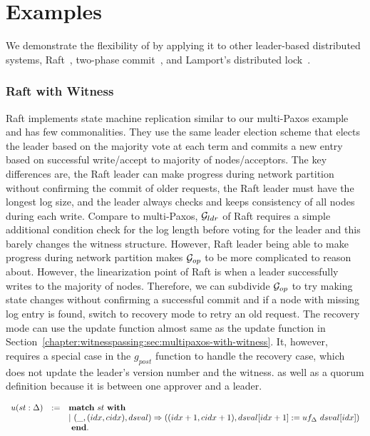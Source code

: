 \section{Examples}
\label{chapter:witnesspassing:sec:examples}

We demonstrate the flexibility of \sysname{} by applying it to other leader-based distributed systems, Raft~\cite{raft}, two-phase commit~\cite{distsys}, and Lamport's distributed
lock~\cite{lamportclock}.

\subsubsection{Raft with Witness}
Raft implements state machine replication similar to our multi-Paxos example and
has few commonalities. They use the same leader election scheme that elects
the leader based on the majority vote at each term and commits a new entry based on
successful write/accept to majority of nodes/acceptors. The key differences are, 
the Raft leader can make progress during network partition without confirming the 
commit of older requests, the Raft leader must have the longest log size, and 
the leader always checks and keeps consistency of all nodes during each write.
Compare to multi-Paxos, $\mathcal{G}_{ldr}$ of Raft requires a simple additional
condition check for the log length before voting for the leader and this barely
changes the witness structure. However, Raft leader being able to make progress
during network partition makes $\mathcal{G}_{op}$ to be more complicated to
reason about. However, the linearization point of Raft is when a leader
successfully writes to the majority of nodes. Therefore, we can subdivide
$\mathcal{G}_{op}$ to try making state changes without confirming a successful
commit and if a node with missing log entry is found, switch to recovery mode
to retry an old request. The recovery mode can use the update function almost same 
as the update function in Section~\ref{chapter:witnesspassing:sec:multipaxos-with-witness}. It, however, 
requires a special case in the $g_{post}$ function to handle the recovery case, 
which does not update the leader's version number and the witness.  
as well as a quorum definition because it is between one approver and a leader.
\begin{center}
$
\begin{array}{lll}
u (st : \dsvalue) &:=&  \mbox{\textbf{match}} \ st \ \mbox{\textbf{with}}\\
&& \vert~(\_, (idx, cidx), dsval) \Rightarrow ((idx + 1, cidx + 1), dsval[idx + 1] := uf_{\dsvalue}\ dsval[idx])\\
&&\ \mbox{\textbf{end}}.\\
\end{array}
$
\end{center}
